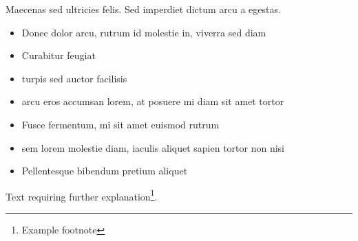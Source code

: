 
Maecenas sed ultricies felis. Sed imperdiet dictum arcu a egestas. 
\begin{itemize}
	\item Donec dolor arcu, rutrum id molestie in, viverra sed diam
	\item Curabitur feugiat
	\item turpis sed auctor facilisis
	\item arcu eros accumsan lorem, at posuere mi diam sit amet tortor
	\item Fusce fermentum, mi sit amet euismod rutrum
	\item sem lorem molestie diam, iaculis aliquet sapien tortor non nisi
	\item Pellentesque bibendum pretium aliquet
\end{itemize}
\blindtext

Text requiring further explanation\footnote{Example footnote}.

